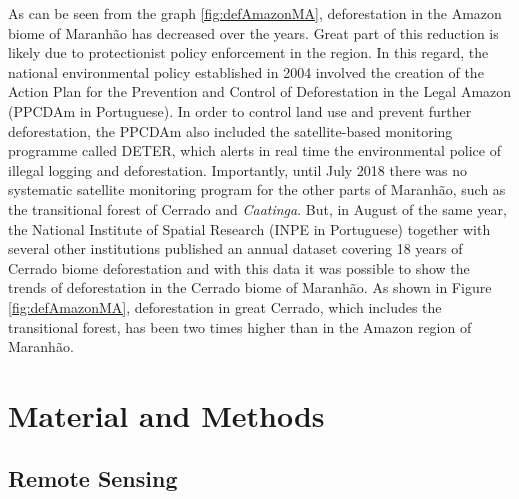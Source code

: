 
As can be seen from the graph \ref{fig:defAmazonMA}, deforestation in the Amazon biome of Maranhão has decreased over the years. Great part of this reduction is likely due to protectionist policy enforcement in the region. In this regard, the national environmental policy established in 2004 involved the creation of the Action Plan for the Prevention and Control of Deforestation in the Legal Amazon (PPCDAm in Portuguese). In order to control land use and prevent further deforestation, the PPCDAm  also included the satellite-based monitoring programme called DETER, which alerts in real time the environmental police of illegal logging and deforestation. Importantly, until July 2018 there was no systematic satellite monitoring program for the other parts of Maranhão, such as the transitional forest of Cerrado and \textit{Caatinga}. But, in August of the same year, the National Institute of Spatial Research (INPE in Portuguese) together with several other institutions published an annual dataset covering 18 years of Cerrado biome deforestation and with this data it was possible to show the trends of deforestation in the Cerrado biome of Maranhão. As shown in Figure \ref{fig:defAmazonMA}, deforestation in great Cerrado, which includes the transitional forest, has been two times higher than in the Amazon region of Maranhão.




\section{Material and Methods}
\subsection{Remote Sensing}  %

